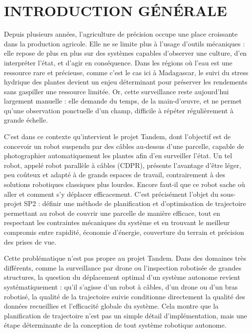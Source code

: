 \setcounter{page}{1}

\chapter*{INTRODUCTION GÉNÉRALE}
\thispagestyle{plain}
\onehalfspacing
\setlength{\parskip}{0.45em}

Depuis plusieurs années, l'agriculture de précision occupe une place croissante dans la production agricole. Elle ne se limite plus à l'usage d'outils mécaniques : elle repose de plus en plus sur des systèmes capables d'observer une culture, d'en interpréter l'état, et d'agir en conséquence. Dans les régions où l'eau est une ressource rare et précieuse, comme c'est le cas ici à Madagascar, le suivi du stress hydrique des plantes devient un enjeu déterminant pour préserver les rendements sans gaspiller une ressource limitée. Or, cette surveillance reste aujourd'hui largement manuelle : elle demande du temps, de la main-d'œuvre, et ne permet qu'une observation ponctuelle d'un champ, difficile à répéter régulièrement à grande échelle.

C'est dans ce contexte qu'intervient le projet Tandem, dont l'objectif est de concevoir un robot suspendu par des câbles au-dessus d'une parcelle, capable de photographier automatiquement les plantes afin d'en surveiller l'état. Un tel robot, appelé robot parallèle à câbles (CDPR), présente l'avantage d'être léger, peu coûteux et adapté à de grands espaces de travail, contrairement à des solutions robotiques classiques plus lourdes. Encore faut-il que ce robot sache où aller et comment s'y déplacer efficacement. C'est précisément l'objet du sous-projet SP2 : définir une méthode de planification et d'optimisation de trajectoire permettant au robot de couvrir une parcelle de manière efficace, tout en respectant les contraintes mécaniques du système et en trouvant le meilleur compromis entre rapidité, économie d'énergie, couverture du terrain et précision des prises de vue.

Cette problématique n'est pas propre au projet Tandem. Dans des domaines très différents, comme la surveillance par drone ou l'inspection robotisée de grandes structures, la question du déplacement optimal d'un système autonome revient systématiquement : qu'il s'agisse d'un robot à câbles, d'un drone ou d'un bras robotisé, la qualité de la trajectoire suivie conditionne directement la qualité des données recueillies et l'efficacité globale du système. Cela montre que la planification de trajectoire n'est pas un simple détail d'implémentation, mais une étape déterminante de la conception de tout système robotique autonome.

\clearpage
\setlength{\parskip}{0.35em}
\onehalfspacing
